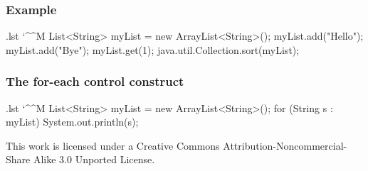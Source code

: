 \documentclass[10pt,handout]{beamer}
\makeatletter
\newenvironment{code}{%
  \begingroup
  \@bsphack
  \immediate\openout\lstvrb@out\jobname.lst
  \let\do\@makeother\dospecials\catcode`\^^M\active
  \def\verbatim@processline{%
    \immediate\write\lstvrb@out{\the\verbatim@line}}%
  \verbatim@start}{%
  \immediate\closeout\lstvrb@out
  \@esphack
  \endgroup
  
  \begin{alertblock}{}
    
  \end{alertblock}}
\makeatother
\begin{document}
\begin{frame}[fragile]
  \frametitle{Example}
  \begin{code}
    List<String> myList = new ArrayList<String>();
    myList.add("Hello");
    myList.add("Bye");
    myList.get(1);
    java.util.Collection.sort(myList);
  \end{code}
\end{frame}

\begin{frame}[fragile]
  \frametitle{The for-each control construct}
  \begin{code}
    List<String> myList = new ArrayList<String>();
    for (String s : myList) {
      System.out.println(s);
    }
  \end{code}
\end{frame}
\begin{frame}
\begin{center}
  \tiny
  This work is licensed under a Creative Commons Attribution-Noncommercial-Share Alike 3.0 Unported License.
\end{center}
\end{frame}
\end{document}
